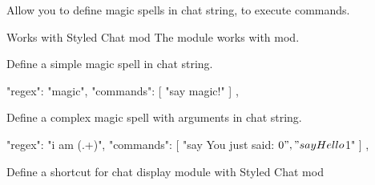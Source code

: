 \label{ch:chat_trigger}
Allow you to define magic spells in chat string, to execute commands.

\begin{tips}{Works with Styled Chat mod}
    The  module works with  mod.
\end{tips}


\begin{example}{Define a simple magic spell in chat string.}
    \begin{jsoncode}
    {
      "regex": "magic",
      "commands": [
        "say magic!"
      ]
    },
    \end{jsoncode}
\end{example}

\begin{example}{Define a complex magic spell with arguments in chat string.}
    \begin{jsoncode}
    {
      "regex": "i am (.+)",
      "commands": [
        "say You just said: $0",
        "say Hello $1"
      ]
    },
    \end{jsoncode}
\end{example}

\begin{example}{Define a shortcut for chat display module with Styled Chat mod}
\end{example}
